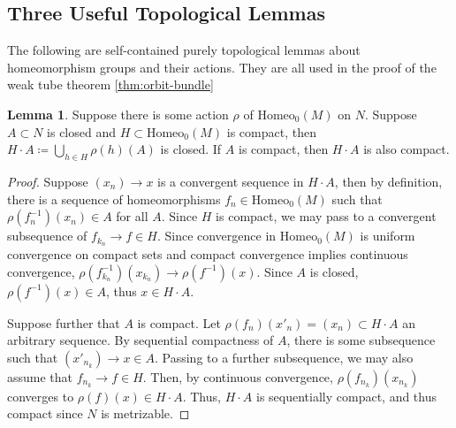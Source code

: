 \documentclass[10pt, oneside]{article}
\newcommand{\homeo}[1][S^1]{\text{Homeo}_0(#1)}
\theoremstyle{definition}
\newtheorem{lem}{Lemma}[section]
\newtheorem{fact}{Fact}
\theoremstyle{definition}
\begin{document}
\subsection{Three Useful Topological Lemmas}\label{subsec:top-lemmas}
The following are self-contained purely topological lemmas about homeomorphism groups and their actions. They are all used in the proof of the weak tube theorem \cref{thm:orbit-bundle}

\begin{lem}\label{lem:union-over-cpct}
    Suppose there is some action $\rho$ of $\homeo[M]$ on $N$. Suppose $A\subset N$ is closed and $H\subset\homeo[M]$ is compact, then $H\cdot A \coloneqq \bigcup_{h\in H} \rho(h)(A)$ is closed. If $A$ is compact, then $H\cdot A$ is also compact.
\end{lem}

\begin{proof}
    Suppose $(x_n)\to x$ is a convergent sequence in $H\cdot A$, then by definition, there is a sequence of homeomorphisms $f_n\in \homeo[M]$ such that $\rho(f_n^{-1})(x_n)\in A$ for all $A$. Since $H$ is compact, we may pass to a convergent subsequence of $f_{k_n}\to f\in H$. Since convergence in $\homeo[M]$ is uniform convergence on compact sets and compact convergence implies continuous convergence, $\rho(f^{-1}_{k_n})(x_{k_n}) \to \rho(f^{-1})(x)$. Since $A$ is closed, $\rho(f^{-1})(x)\in A$, thus $x\in H\cdot A$.

    Suppose further that $A$ is compact. Let $\rho(f_n)(x'_n)=(x_n)\subset H\cdot A$ an arbitrary sequence. By sequential compactness of $A$, there is some subsequence such that $(x'_{n_k})\to x\in A$. Passing to a further subsequence, we may also assume that $f_{n_k}\to f\in H$. Then, by continuous convergence, $\rho(f_{n_k})(x_{n_k})$ converges to $\rho(f)(x)\in H\cdot A$. Thus, $H\cdot A$ is sequentially compact, and thus compact since $N$ is metrizable.
\end{proof}
\end{document}
